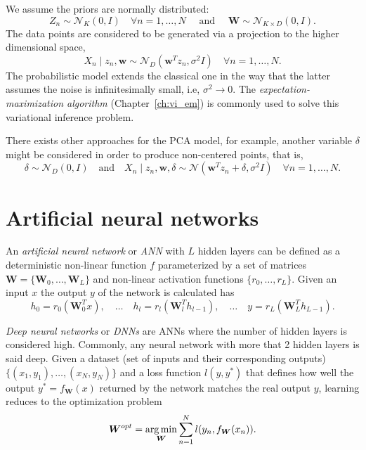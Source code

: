 We assume the priors are normally distributed:
\[
  Z_{n} \sim \mathcal{N}_{K}(0, I) \quad \forall n =1,\dots,N \quad \text{ and } \quad \bm{W} \sim \mathcal{N}_{K\times D}(0, I).
\]
The data points are considered to be generated via a projection to the higher dimensional space,
\[
  X_{n} \mid z_{n}, \bm{w} \sim \mathcal{N}_{D}(\bm{w}^{T}z_{n}, \sigma^{2}I)\quad \forall n = 1,\dots, N.
\]
The probabilistic model extends the classical one in the way that the latter assumes the noise is infinitesimally small, i.e, \(\sigma^{2} \to 0\). The \emph{expectation-maximization algorithm} (Chapter~\ref{ch:vi_em}) is commonly used to solve this variational inference problem.

There exists other approaches for the PCA model, for example, another variable \(\delta\) might be considered in order to produce non-centered points, that is,
\[
  \delta \sim \mathcal{N}_{D}(0, I) \quad \text{and} \quad   X_{n} \mid z_{n}, \bm{w}, \delta \sim \mathcal{N}(\bm{w}^{T}z_{n} + \delta, \sigma^{2}I)\quad \forall n = 1,\dots, N.
\]

\section{Artificial neural networks}

An \emph{artificial neural network} or \emph{ANN} with \(L\) hidden layers can be defined as a deterministic non-linear function \(f\) parameterized by a set of matrices \(\bm{W} = \{\bm{W}_{0},\dots, \bm{W}_{L}\}\) and non-linear activation functions \(\{r_{0},\dots, r_{L}\}\). Given an input \(x\) the output \(y\) of the network is calculated has
\[
  h_{0} = r_{0}(\bm{W}^{T}_{0}x), \quad \dots \quad h_{l} = r_{l}(\bm{W}_{l}^{T}h_{l-1}), \quad \dots \quad y = r_{L}(\bm{W}_{L}^{T}h_{L-1}).
\]

\emph{Deep neural networks} or \emph{DNNs} are ANNs where the number of hidden layers is considered high. Commonly, any neural network with more that 2 hidden layers is said deep. Given a dataset (set of inputs and their corresponding outputs) \(\{(x_{1}, y_{1}), \dots, (x_{N}, y_{N})\}\) and a loss function \(l(y,y^{*})\) that defines how well the output \(y^{*} = f_{\bm{W}}(x)\)  returned by the network matches the real output \(y\), learning reduces to the optimization problem
\[
  \bm{W}^{opt} = \operatorname*{arg\,min}_{\bm{W}} \sum_{n=1}^{N}l(y_{n}, f_{\bm{W}}(x_{n})).
\]


